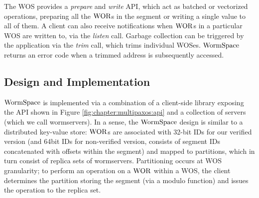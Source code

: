 The WOS provides a \textit{prepare} and \textit{write} API, which act as batched or vectorized operations, preparing all the $\mathrm{WOR}$s in the segment or writing a single value to all of them.
A client can also receive notifications when $\mathrm{WOR}$s in a particular WOS are written to, via the \textit{listen} call.
Garbage collection can be triggered by the application via the \textit{trim} call, which trims individual WOSes. 
$\mathrm{WormSpace}$ returns an error code when a trimmed address is subsequently accessed.






\subsection{Design and Implementation}
\label{chapter:wormspace:subsec:design-and-implementation}


$\mathrm{WormSpace}$ is implemented via a combination of a client-side library exposing the API shown in 
Figure \ref{fig:chapter:multipaxos:api} and a collection of servers (which we call wormservers). 
In a sense, the $\mathrm{WormSpace}$ design is similar to a distributed key-value store: 
$\mathrm{WOR}$s are associated with 32-bit IDs for our verified version (and 64bit IDs for non-verified version, 
consists of segment IDs concatenated with offsets within the segment) and mapped to partitions, 
which in turn consist of replica sets of wormservers. Partitioning occurs at WOS granularity; 
to perform an operation on a $\mathrm{WOR}$ within a WOS, the client determines the partition storing the segment 
(via a modulo function) and issues the operation to the replica set.


